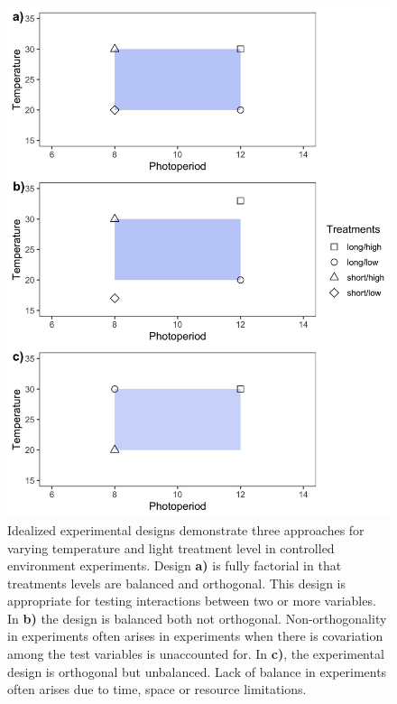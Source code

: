 \documentclass[11pt]{article}
\begin{document}
{\begin{figure}[h!]
    \centering
 \includegraphics[width=.8\textwidth]{..//Plots/periodicity_figures/factorial.jpeg}
    \caption{Idealized experimental designs demonstrate three approaches for varying temperature and light treatment level in controlled environment experiments. Design \textbf{a)} is fully factorial in that treatments levels are balanced and orthogonal. This design is appropriate for testing interactions between two or more variables. In \textbf{b)} the design is balanced both not orthogonal. Non-orthogonality in experiments often arises in experiments when there is covariation among the test variables is unaccounted for. In \textbf{c)}, the experimental design is orthogonal but unbalanced. Lack of balance in experiments often arises due to time, space or resource limitations. }
    \label{fig:examp}
\end{figure}

}
\end{document}
